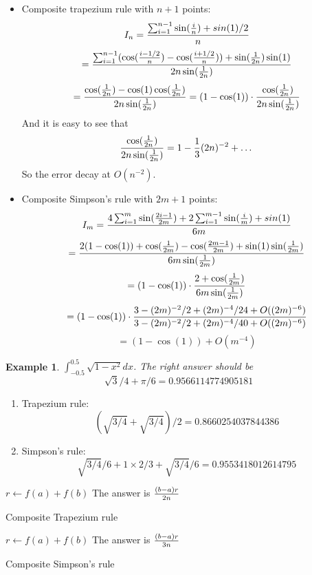 \documentclass[20pt]{article} %
\theoremstyle{break}
\newtheorem{exa}[definition]{Example}
\begin{document}
\begin{itemize}
\item Composite trapezium rule with $n+1$ points:
  \[I_n={\sum_{i=1}^{n-1}\sin({i\over n})+sin(1)/2\over n}\]
  \[={\sum_{i=1}^{n-1}(\cos({i-1/2\over n})-\cos({i+1/2\over n}))+\sin({1\over 2n})\sin(1)\over 2n\sin({1\over 2n})}\]
  \[={\cos({1\over 2n})-\cos(1)\cos({1\over 2n})\over 2n\sin({1\over 2n})}=(1-\cos(1))\cdot{\cos({1\over 2n})\over 2n\sin({1\over 2n})}\]
  And it is easy to see that
  \[{\cos({1\over 2n})\over 2n\sin({1\over 2n})}=1-{1\over 3}(2n)^{-2}+\dots\]
  So the error decay at $O(n^{-2})$.

\newpage

\item Composite Simpson's rule with $2m+1$ points:
  \[I_m={4\sum_{i=1}^{m}\sin({2i-1\over 2m})+2\sum_{i=1}^{m-1}\sin({i\over m})+sin(1)\over 6m}\]
  \[={2(1-\cos(1))+\cos({1\over 2m})-\cos({2m-1\over 2m})+\sin(1)\sin({1\over 2m})\over 6m\sin({1\over 2m})}\]
  \[=(1-\cos(1))\cdot{2+\cos({1\over 2m})\over 6m\sin({1\over 2m})}\]
  \[=(1-\cos(1))\cdot{3-(2m)^{-2}/2+(2m)^{-4}/24+O((2m)^{-6})\over 3-(2m)^{-2}/2+(2m)^{-4}/40+O((2m)^{-6})}\]
  \[=(1-\cos(1))+O(m^{-4})\]
\end{itemize}

\newpage

\begin{exa}$\int_{-0.5}^{0.5}\sqrt{1-x^2}dx$. The right answer should be
  \[\sqrt{3}/4+\pi/6=0.9566114774905181\]
\end{exa}

\begin{enumerate}
  \item Trapezium rule:
    \[(\sqrt{3/4}+\sqrt{3/4})/2=0.8660254037844386\]
  \item Simpson's rule:
    \[\sqrt{3/4}/6+1\times 2/3+\sqrt{3/4}/6=0.9553418012614795\]
  \end{enumerate}

 \newpage
{}
\LinesNumbered
 \begin{algorithm}[H]
 $r\leftarrow f(a)+f(b)$\;  
 The answer is ${(b-a)r\over 2n}$\;
 \caption{Composite Trapezium rule}
\end{algorithm}


\LinesNumbered
 \begin{algorithm}[H]
 $r\leftarrow f(a)+f(b)$\;  
 The answer is ${(b-a)r\over 3n}$\;
 \caption{Composite Simpson's rule}
\end{algorithm}
\end{document}
